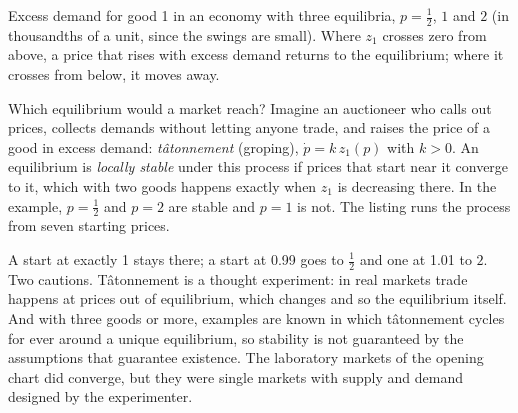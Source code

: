 \begin{omfigure}

{\small Excess demand for good 1 in an economy with three equilibria, $p = \tfrac12$, $1$ and $2$ (in
thousandths of a unit, since the swings are small). Where $z_1$ crosses zero from above, a price that
rises with excess demand returns to the equilibrium; where it crosses from below, it moves away.}
\end{omfigure}

Which equilibrium would a market reach? Imagine an auctioneer who calls out prices, collects demands
without letting anyone trade, and raises the price of a good in excess demand: \emph{tâtonnement}
(groping), $\dot p = k\,z_1(p)$ with $k > 0$. An equilibrium is \emph{locally stable} under this process if
prices that start near it converge to it, which with two goods happens exactly when $z_1$ is decreasing
there. In the example, $p = \tfrac12$ and $p = 2$ are stable and $p = 1$ is not. The listing runs the
process from seven starting prices.

\label{lst:b2:exchange-economies:tatonnement}

\label{out:b2:exchange-economies:tatonnement}

A start at exactly 1 stays there; a start at 0.99 goes to $\tfrac12$ and one at 1.01 to $2$. Two
cautions. Tâtonnement is a thought experiment: in real markets trade happens at prices out of
equilibrium, which changes  and so the equilibrium itself. And with three goods or more,
examples are known in which tâtonnement cycles for ever around a unique equilibrium, so stability is not
guaranteed by the assumptions that guarantee existence. The laboratory markets of the opening chart did
converge, but they were single markets with supply and demand designed by the experimenter.

